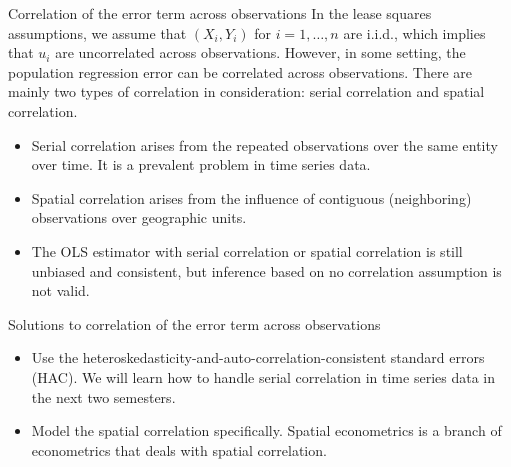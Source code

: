 \documentclass[presentation,10pt]{beamer}
\begin{document}
\begin{frame}[label={sec:org7ffd06d}]{Correlation of the error term across observations}
In the lease squares assumptions, we assume that \((X_i, Y_i)\) for
\(i=1, \ldots, n\) are i.i.d., which implies that \(u_i\) are uncorrelated
across observations. However, in some setting, the population
regression error can be correlated across observations. There are
mainly two types of correlation in consideration: serial correlation
and spatial correlation. 

\begin{itemize}
\item Serial correlation arises from the repeated observations over the
same entity over time. It is a prevalent problem in time series
data.
\item Spatial correlation arises from the influence of contiguous
(neighboring) observations over geographic units.
\item The OLS estimator with serial correlation or spatial correlation is
still unbiased and consistent, but inference based on no correlation
assumption is not valid.
\end{itemize}
\end{frame}

\begin{frame}[label={sec:org78f3eb3}]{Solutions to correlation of the error term across observations}
\begin{itemize}
\item Use the \alert{heteroskedasticity-and-auto-correlation-consistent
standard errors (HAC)}. We will learn how to handle serial
correlation in time series data in the next two semesters.
\end{itemize}

\vspace{0.3cm}
\begin{itemize}
\item Model the spatial correlation specifically. Spatial econometrics
is a branch of econometrics that deals with spatial correlation.
\end{itemize}
\end{frame}
\end{document}
